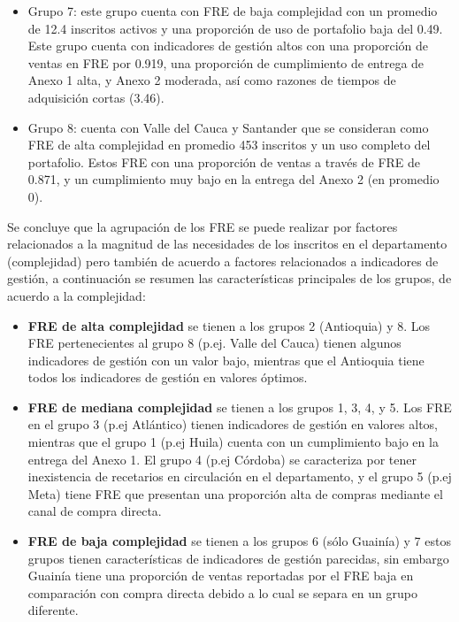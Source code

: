 \documentclass[
]{book}
\begin{document}
\begin{itemize}
\item
  Grupo 7: este grupo cuenta con FRE de baja complejidad con un promedio de 12.4 inscritos activos y una proporción de uso de portafolio baja del 0.49. Este grupo cuenta con indicadores de gestión altos con una proporción de ventas en FRE por 0.919, una proporción de cumplimiento de entrega de Anexo 1 alta, y Anexo 2 moderada, así como razones de tiempos de adquisición cortas (3.46).
\item
  Grupo 8: cuenta con Valle del Cauca y Santander que se consideran como FRE de alta complejidad en promedio 453 inscritos y un uso completo del portafolio. Estos FRE con una proporción de ventas a través de FRE de 0.871, y un cumplimiento muy bajo en la entrega del Anexo 2 (en promedio 0).
\end{itemize}

Se concluye que la agrupación de los FRE se puede realizar por factores relacionados a la magnitud de las necesidades de los inscritos en el departamento (complejidad) pero también de acuerdo a factores relacionados a indicadores de gestión, a continuación se resumen las características principales de los grupos, de acuerdo a la complejidad:

\begin{itemize}
\item
  \textbf{FRE de alta complejidad} se tienen a los grupos 2 (Antioquia) y 8. Los FRE pertenecientes al grupo 8 (p.ej. Valle del Cauca) tienen algunos indicadores de gestión con un valor bajo, mientras que el Antioquia tiene todos los indicadores de gestión en valores óptimos.
\item
  \textbf{FRE de mediana complejidad} se tienen a los grupos 1, 3, 4, y 5. Los FRE en el grupo 3 (p.ej Atlántico) tienen indicadores de gestión en valores altos, mientras que el grupo 1 (p.ej Huila) cuenta con un cumplimiento bajo en la entrega del Anexo 1. El grupo 4 (p.ej Córdoba) se caracteriza por tener inexistencia de recetarios en circulación en el departamento, y el grupo 5 (p.ej Meta) tiene FRE que presentan una proporción alta de compras mediante el canal de compra directa.
\item
  \textbf{FRE de baja complejidad} se tienen a los grupos 6 (sólo Guainía) y 7 estos grupos tienen características de indicadores de gestión parecidas, sin embargo Guainía tiene una proporción de ventas reportadas por el FRE baja en comparación con compra directa debido a lo cual se separa en un grupo diferente.
\end{itemize}
\end{document}
